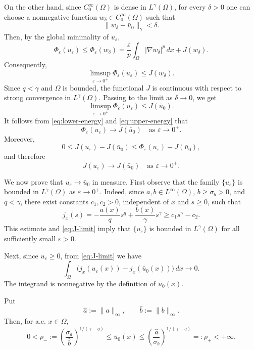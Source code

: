 \documentclass[preprint,11pt]{elsarticle}
\numberwithin{equation}{section}
\begin{document}
On the other hand, since \(C_0^\infty(\Omega)\) is dense in
\(L^\gamma(\Omega)\), for every \(\delta>0\) one can choose a nonnegative
function \(w_\delta\in C_0^\infty(\Omega)\) such that
\[
\|w_\delta-\bar u_0\|_\gamma<\delta .
\]
Then, by the global minimality of \(u_\varepsilon\),
\[
\Phi_\varepsilon(u_\varepsilon)
\le
\Phi_\varepsilon(w_\delta)
=
\frac{\varepsilon}{p}\int_\Omega |\nabla w_\delta|^p\,dx
+
J(w_\delta).
\]
Consequently,
\[
\limsup_{\varepsilon\to0^+}
\Phi_\varepsilon(u_\varepsilon)
\le
J(w_\delta).
\]
Since \(q<\gamma\) and \(\Omega\) is bounded, the functional \(J\) is
continuous with respect to strong convergence in \(L^\gamma(\Omega)\).
Passing to the limit as \(\delta\to0\), we get
\begin{equation}\label{eq:upper-energy}
	\limsup_{\varepsilon\to0^+}
	\Phi_\varepsilon(u_\varepsilon)
	\le
	J(\bar u_0).
\end{equation}
It follows from \eqref{eq:lower-energy} and \eqref{eq:upper-energy} that
\begin{equation}\label{eq:energy-limit}
	\Phi_\varepsilon(u_\varepsilon)
	\to
	J(\bar u_0)
	\quad\text{as } \varepsilon\to0^+ .
\end{equation}
Moreover,
\[
0
\le
J(u_\varepsilon)-J(\bar u_0)
\le
\Phi_\varepsilon(u_\varepsilon)-J(\bar u_0),
\]
and therefore
\begin{equation}\label{eq:J-limit}
	J(u_\varepsilon)
	\to
	J(\bar u_0)
	\quad\text{as } \varepsilon\to0^+ .
\end{equation}

We now prove that \(u_\varepsilon\to\bar u_0\) in measure. First observe
that the family \(\{u_\varepsilon\}\) is bounded in \(L^\gamma(\Omega)\) as
\(\varepsilon\to0^+\). Indeed, since
\(a,b\in L^\infty(\Omega)\), \(b\ge\sigma_b>0\), and \(q<\gamma\), there
exist constants \(c_1,c_2>0\), independent of \(x\) and \(s\ge0\), such that
\[
j_x(s)
=
-\frac{a(x)}q s^q+\frac{b(x)}\gamma s^\gamma
\ge
c_1s^\gamma-c_2 .
\]
This estimate and \eqref{eq:J-limit} imply that
\(\{u_\varepsilon\}\) is bounded in \(L^\gamma(\Omega)\) for all sufficiently
small \(\varepsilon>0\).

Next, since \(u_\varepsilon\ge0\), from \eqref{eq:J-limit} we have
\begin{equation}\label{eq:integral-gap}
	\int_\Omega
	\bigl(
	j_x(u_\varepsilon(x))-j_x(\bar u_0(x))
	\bigr)\,dx
	\to0 .
\end{equation}
The integrand is nonnegative by the definition of \(\bar u_0(x)\).

Put
\[
\hat a:=\|a\|_\infty,
\qquad
\hat b:=\|b\|_\infty .
\]
Then, for a.e. \(x\in\Omega\),
\[
0<\rho_-
:=
\left(\frac{\sigma_a}{\hat b}\right)^{1/(\gamma-q)}
\le
\bar u_0(x)
\le
\left(\frac{\hat a}{\sigma_b}\right)^{1/(\gamma-q)}
=:\rho_+
<+\infty .
\]
\end{document}
